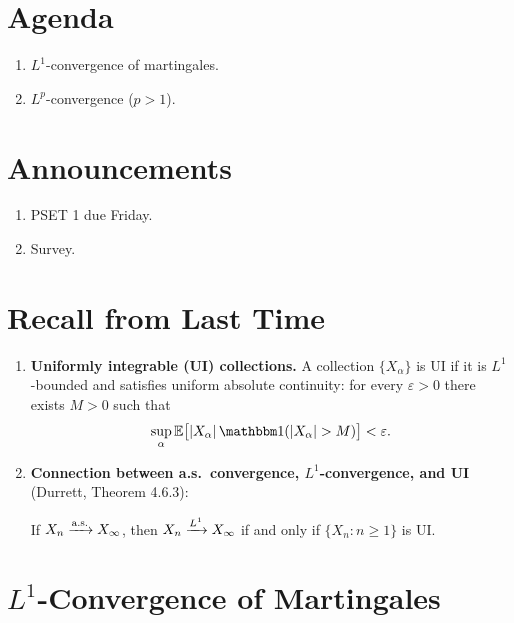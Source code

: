 
\section*{Agenda}
\begin{enumerate}
    \item $L^1$-convergence of martingales.
    \item $L^p$-convergence ($p > 1$).
\end{enumerate}

\section*{Announcements}
\begin{enumerate}
    \item PSET 1 due Friday.
    \item Survey.
\end{enumerate}

\section{Recall from Last Time}

\begin{enumerate}[label=(\roman*)]
    \item \textbf{Uniformly integrable (UI) collections.} A collection $\{X_\alpha\}$ is UI if it is $L^1$-bounded and satisfies uniform absolute continuity: for every $\varepsilon > 0$ there exists $M > 0$ such that
    \[
        \sup_\alpha \E\bigl[\abs{X_\alpha} \ind(\abs{X_\alpha} > M)\bigr] < \varepsilon.
    \]

    \item \textbf{Connection between a.s.\ convergence, $L^1$-convergence, and UI} (Durrett, Theorem 4.6.3):

    If $X_n \xrightarrow{\text{a.s.}} X_\infty$, then $X_n \xrightarrow{L^{1}} X_\infty$ if and only if $\{X_n : n \geq 1\}$ is UI.
\end{enumerate}

\section{\texorpdfstring{$L^1$}{L1}-Convergence of Martingales}

